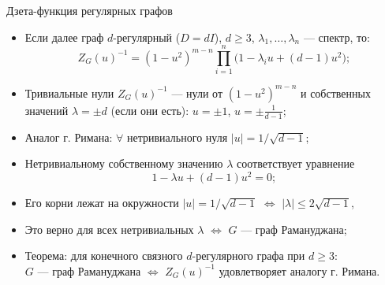 \documentclass[serif, aspectratio=169]{beamer}
\begin{document}
\begin{frame}{Дзета-функция регулярных графов}
    \begin{itemize}
        \item Если далее граф $d$-регулярный ($D=dI$), $d\ge3$, $\lambda_1,\dots,\lambda_n$ --- спектр, то:
        \[Z_G(u)^{-1}=(1-u^2)^{m-n}\prod_{i=1}^n\bigl(1-\lambda_i u+(d-1)u^2\bigr);\]
        \item Тривиальные нули $Z_G(u)^{-1}$ --- нули от $(1-u^2)^{m-n}$ и собственных значений
        $\lambda=\pm d$ (если они есть): $u=\pm1$, $u=\pm\frac{1}{d-1}$;
        \item Аналог г. Римана: $\forall$ нетривиального нуля $|u|=1/\sqrt{d-1}$;
        \item Нетривиальному собственному значению $\lambda$ соответствует уравнение
        \[1-\lambda u+(d-1)u^2=0;\]

        \item Его корни лежат на окружности $|u|=1/\sqrt{d-1}$ $\Leftrightarrow$ $|\lambda|\le2\sqrt{d-1}$,
        \item Это верно для всех нетривиальных $\lambda$ $\Leftrightarrow$ $G$ --- граф Рамануджана;
        
        \item Теорема: для конечного связного $d$-регулярного графа при $d\ge3$:\\
        $G$ --- граф Рамануджана $\Leftrightarrow$ $Z_G(u)^{-1}$ удовлетворяет аналогу г. Римана.
    \end{itemize}
    \note{
        \begin{itemize}
            \item ---
        \end{itemize}
    }
\end{frame}
\end{document}
